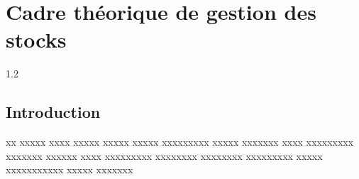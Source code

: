 \chapter{Cadre théorique de gestion des stocks}
\begin{spacing}{1.2}
\minitoc
\thispagestyle{MyStyle}
\end{spacing}
\newpage

\section{Introduction}
xx xxxxx xxxx xxxxx xxxxx xxxxx xxxxxxxxx xxxxx xxxxxxx xxxx xxxxxxxxx xxxxxxx xxxxxx xxxx xxxxxxxxx xxxxxxxx xxxxxxxx xxxxxxxxx xxxxx xxxxxxxxxxx xxxxx xxxxxxx 